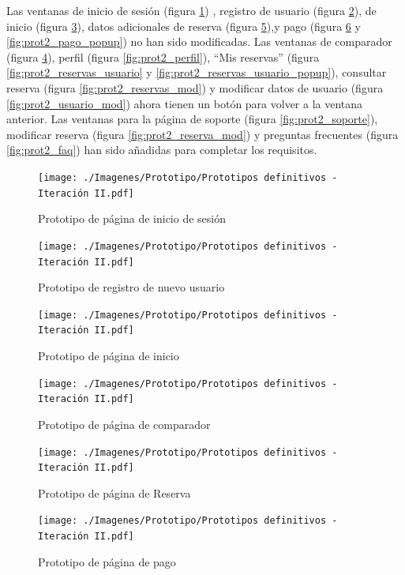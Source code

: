 Las ventanas de inicio de sesión (figura \ref{fig:prot2_ses}) , registro de usuario (figura \ref{fig:prot2_reg}), de inicio (figura \ref{fig:prot2_inicio}), datos adicionales de reserva (figura \ref{fig:prot2_reser}),y pago (figura \ref{fig:prot2_pago} y \ref{fig:prot2_pago_popup}) no han sido modificadas.
Las ventanas de comparador (figura \ref{fig:prot2_comp}), perfil (figura \ref{fig:prot2_perfil}), ``Mis reservas'' (figura \ref{fig:prot2_reservas_usuario} y \ref{fig:prot2_reservas_usuario_popup}), consultar reserva (figura \ref{fig:prot2_reservas_mod}) y modificar datos de usuario (figura \ref{fig:prot2_usuario_mod}) ahora tienen un botón para volver a la ventana anterior.
Las ventanas para la página de soporte (figura \ref{fig:prot2_soporte}), modificar reserva (figura \ref{fig:prot2_reserva_mod}) y preguntas frecuentes (figura \ref{fig:prot2_faq}) han sido añadidas para completar los requisitos.
\begin{figure}[H]
    \centering
    \texttt{[image: ./Imagenes/Prototipo/Prototipos definitivos - Iteración II.pdf]}
    \caption{Prototipo de página de inicio de sesión}
    \label{fig:prot2_ses}
\end{figure}

\begin{figure}[H]
    \centering
    \texttt{[image: ./Imagenes/Prototipo/Prototipos definitivos - Iteración II.pdf]}
    \caption{Prototipo de registro de nuevo usuario}
    \label{fig:prot2_reg}
\end{figure}

\begin{figure}[H]
    \centering
    \texttt{[image: ./Imagenes/Prototipo/Prototipos definitivos - Iteración II.pdf]}
    \caption{Prototipo de página de inicio}
    \label{fig:prot2_inicio}
\end{figure}

\begin{figure}[H]
    \centering
    \texttt{[image: ./Imagenes/Prototipo/Prototipos definitivos - Iteración II.pdf]}
    \caption{Prototipo de página de comparador}
    \label{fig:prot2_comp}
\end{figure}

\begin{figure}[H]
    \centering
    \texttt{[image: ./Imagenes/Prototipo/Prototipos definitivos - Iteración II.pdf]}
    \caption{Prototipo de página de Reserva}
    \label{fig:prot2_reser}
\end{figure}

\begin{figure}[H]
    \centering
    \texttt{[image: ./Imagenes/Prototipo/Prototipos definitivos - Iteración II.pdf]}
    \caption{Prototipo de página de pago}
    \label{fig:prot2_pago}
\end{figure}

